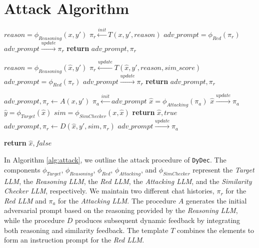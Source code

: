 \documentclass[11pt]{article}
\newcommand \dydec[0]{\texttt{DyDec}}
\begin{document}
\section{Attack Algorithm}
\label{sec:attack_algorithm}
\begin{algorithm}[ht!]
\caption{Dynamic Deceptor Attack}
\label{alg:attack}
\begin{algorithmic}[1]
    \State $ reason = \phi_{Reasoning}(x,y\prime)$
    \State $ \pi_{r} \xleftarrow{init} T(x, y\prime, reason)$
    \State $adv\_prompt= \phi_{Red}(\pi_{r})$
    \State $ adv\_prompt  \xrightarrow{update} \pi_{r}$
    \State  \textbf{return} $adv\_prompt, \pi_{r}$
    
\EndProcedure
{}
    \State $ reason = \phi_{Reasoning}(\widehat{x},y\prime)$
    \State $ \pi_{r} \xleftarrow{update} T(\widehat{x}, y\prime, reason, sim\_score)$
    \State $adv\_prompt= \phi_{Red}(\pi_{r})$
    \State $ adv\_prompt  \xrightarrow{update} \pi_{r}$
    \State  \textbf{return} $adv\_prompt, \pi_{r}$
\EndProcedure
{}
    
    \State $adv\_prompt, \pi_{r} \gets A(x, y\prime)$
    \State $ \pi_{a} \xleftarrow{init} adv\_prompt$
        \State $\widehat{x}= \phi_{Attacking}(\pi_{a})$
        \State $\widehat{x} \xrightarrow{update} \pi_{a}$ 
        \State $\widehat{y} = \phi_{Target}(\widehat{x})$
        \State $ sim = \phi_{SimChecker}(x,\widehat{x})$
            \State  \textbf{return} $\widehat{x}, true$
        \EndIf
        \State $adv\_prompt, \pi_{r} \gets D(\widehat{x}, y\prime, sim, \pi_{r})$
        \State $ adv\_prompt  \xrightarrow{update} \pi_{a}$
        
    \EndFor
    
    \State  \textbf{return} $\widehat{x}, false$
\EndProcedure


\end{algorithmic}
\end{algorithm}


In Algorithm \ref{alg:attack}, we outline the attack procedure of \dydec{}. The components $\phi_{Target}$, $\phi_{Reasoning}$, $\phi_{Red}$, $\phi_{Attacking}$, and $\phi_{SimChecker}$ represent the \textsl{Target LLM}, the \textsl{Reasoning LLM}, the \textsl{Red LLM}, the \textsl{Attacking LLM}, and the \textsl{Similarity Checker LLM}, respectively. We maintain two different chat histories, $\pi_{r}$ for the \textsl{Red LLM} and $\pi_{a}$ for the \textsl{Attacking LLM}. The procedure $A$ generates the initial adversarial prompt based on the reasoning provided by the \textsl{Reasoning LLM}, while the procedure $D$ produces subsequent dynamic feedback by integrating both reasoning and similarity feedback. The template $T$ combines the elements to form an instruction prompt for the \textsl{Red LLM}. 
\end{document}
